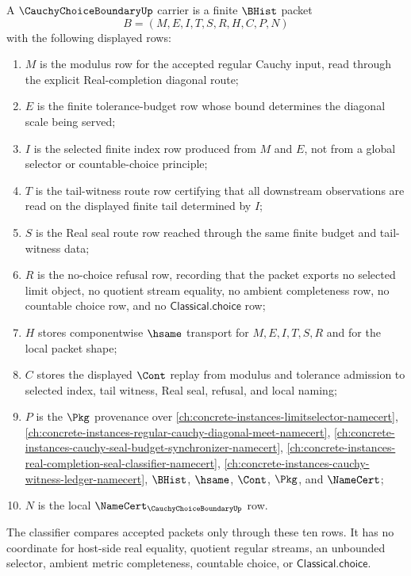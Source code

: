 \begin{definition}
\label{def:cauchy-choice-boundary-carrier}
A $\CauchyChoiceBoundaryUp$ carrier is a finite $\BHist$ packet
$$
B=(M,E,I,T,S,R,H,C,P,N)
$$
with the following displayed rows:
\begin{enumerate}
\item $M$ is the modulus row for the accepted regular Cauchy input, read through the explicit Real-completion diagonal route;
\item $E$ is the finite tolerance-budget row whose bound determines the diagonal scale being served;
\item $I$ is the selected finite index row produced from $M$ and $E$, not from a global selector or countable-choice principle;
\item $T$ is the tail-witness route row certifying that all downstream observations are read on the displayed finite tail determined by $I$;
\item $S$ is the Real seal route row reached through the same finite budget and tail-witness data;
\item $R$ is the no-choice refusal row, recording that the packet exports no selected limit object, no quotient stream equality, no ambient completeness row, no countable choice row, and no $\mathsf{Classical.choice}$ row;
\item $H$ stores componentwise $\hsame$ transport for $M,E,I,T,S,R$ and for the local packet shape;
\item $C$ stores the displayed $\Cont$ replay from modulus and tolerance admission to selected index, tail witness, Real seal, refusal, and local naming;
\item $P$ is the $\Pkg$ provenance over \autoref{ch:concrete-instances-limitselector-namecert}, \autoref{ch:concrete-instances-regular-cauchy-diagonal-meet-namecert}, \autoref{ch:concrete-instances-cauchy-seal-budget-synchronizer-namecert}, \autoref{ch:concrete-instances-real-completion-seal-classifier-namecert}, \autoref{ch:concrete-instances-cauchy-witness-ledger-namecert}, $\BHist$, $\hsame$, $\Cont$, $\Pkg$, and $\NameCert$;
\item $N$ is the local $\NameCert_{\CauchyChoiceBoundaryUp}$ row.
\end{enumerate}
The classifier compares accepted packets only through these ten rows. It has no coordinate for host-side real equality, quotient regular streams, an unbounded selector, ambient metric completeness, countable choice, or $\mathsf{Classical.choice}$.
\end{definition}

